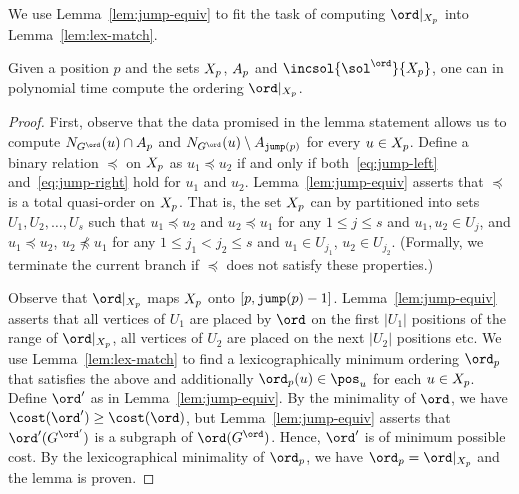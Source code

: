 We use Lemma~\ref{lem:jump-equiv} to fit the task of computing $\ord|_{\jumpset{p}}$ into Lemma~\ref{lem:lex-match}.
\begin{lemma}\label{lem:jump-detect}
Given a position $p$ and the sets $X_{p}$, $A_{p}$ and
$\incsol{\sol^\ord}{\jumpset{p}}$, one can
in polynomial time compute the ordering $\ord|_{\jumpset{p}}$.
\end{lemma}
\begin{proof}
First, observe that the data promised in the lemma statement allows
us to compute $N_{G^\ord}(u) \cap \secp{p}$ and $N_{G^\ord}(u) \setminus \secp{\jump{p}}$
for every $u \in X_{p}$.
Define a binary relation $\preceq$ on $X_{p}$ as $u_1 \preceq u_2$ if and only if
both~\eqref{eq:jump-left} and~\eqref{eq:jump-right} hold for $u_1$ and $u_2$.
Lemma~\ref{lem:jump-equiv} asserts that $\preceq$ is a total quasi-order on $X_{p}$.
That is, the set $X_{p}$ can by partitioned into sets $U_1,U_2,\ldots,U_s$
such that $u_1 \preceq u_2$ and $u_2 \preceq u_1$ for any $1 \leq j \leq s$ and
$u_1,u_2 \in U_j$, and $u_1 \preceq u_2$, $u_2 \not\preceq u_1$ for any $1 \leq j_1 < j_2 \leq s$
and $u_1 \in U_{j_1}$, $u_2 \in U_{j_2}$.
(Formally, we terminate the current branch if $\preceq$ does not satisfy these properties.)

Observe that $\ord|_{\jumpset{p}}$ maps $X_{p}$ onto $[p,\mathtt{jump}(p)-1]$.
Lemma~\ref{lem:jump-equiv} asserts that all vertices of $U_1$
are placed by $\ord$ on the first $|U_1|$ positions of the range of $\ord|_{\jumpset{p}}$,
all vertices of $U_2$ are placed on the next $|U_2|$ positions etc.
We use Lemma~\ref{lem:lex-match} to find a lexicographically minimum ordering $\ord_p$ that satisfies the above
and additionally $\ord_p(u) \in \pos_u$ for each $u \in X_{p}$.
Define $\ord'$ as in Lemma~\ref{lem:jump-equiv}.
By the minimality of $\ord$, we have $\cost(\ord') \geq \cost(\ord)$, but Lemma~\ref{lem:jump-equiv}
asserts that $\ord'(G^{\ord'})$ is a subgraph of $\ord(G^\ord)$.
Hence, $\ord'$ is of minimum possible cost.
By the lexicographical minimality of $\ord_p$, we have $\ord_p = \ord|_{\jumpset{p}}$
and the lemma is proven.
\end{proof}



